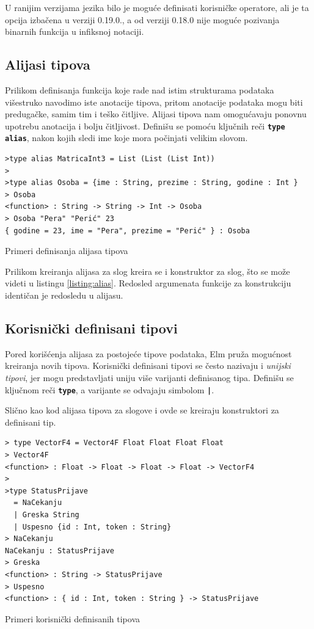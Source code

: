 \documentclass[12pt,oneside]{memoir}
\begin{document}
U ranijim verzijama jezika bilo je moguće definisati korisničke operatore, ali je ta
opcija izbačena u verziji 0.19.0., a od verziji 0.18.0 nije moguće pozivanja 
binarnih funkcija u infiksnoj notaciji.

\subsection{Alijasi tipova}
Prilikom definisanja funkcija koje rade nad istim strukturama podataka višestruko navodimo
iste anotacije tipova, pritom anotacije podataka mogu biti predugačke, samim tim i
teško čitljive. Alijasi tipova nam omogućavaju ponovnu upotrebu anotacija i bolju čitljivost.
Definišu se pomoću ključnih reči \texttt{\textbf{type alias}}, nakon kojih sledi ime koje
mora počinjati velikim slovom. 
\begin{listing}[h]
\begin{verbatim}
>type alias MatricaInt3 = List (List (List Int))
>
>type alias Osoba = {ime : String, prezime : String, godine : Int }
> Osoba
<function> : String -> String -> Int -> Osoba
> Osoba "Pera" "Perić" 23
{ godine = 23, ime = "Pera", prezime = "Perić" } : Osoba
\end{verbatim}
\caption{Primeri definisanja alijasa tipova}
\label{listing:alias}
\end{listing}

Prilikom kreiranja alijasa za slog kreira se i konstruktor za slog, što se može videti
u listingu \ref{listing:alias}. Redosled argumenata funkcije za konstrukciju identičan je
redosledu u alijasu.
\subsection{Korisnički definisani tipovi}
Pored korišćenja alijasa za postojeće tipove podataka, Elm pruža mogućnost kreiranja novih 
tipova. Korisnički definisani tipovi se često nazivaju i \emph{unijski tipovi}, jer mogu  
predstavljati uniju više varijanti definisanog tipa. Definišu se ključnom reči 
\textbf{\texttt{type}}, a varijante se odvajaju simbolom \texttt{\textbf{|}}.

Slično kao kod alijasa tipova za slogove i ovde se kreiraju konstruktori za definisani tip. 
\begin{listing}[h]
\begin{verbatim}
> type VectorF4 = Vector4F Float Float Float Float
> Vector4F
<function> : Float -> Float -> Float -> Float -> VectorF4
>
>type StatusPrijave 
  = NaCekanju 
  | Greska String 
  | Uspesno {id : Int, token : String}
> NaCekanju
NaCekanju : StatusPrijave
> Greska
<function> : String -> StatusPrijave
> Uspesno
<function> : { id : Int, token : String } -> StatusPrijave
\end{verbatim}
\caption{ Primeri korisnički definisanih tipova}
\end{listing}
\end{document}
